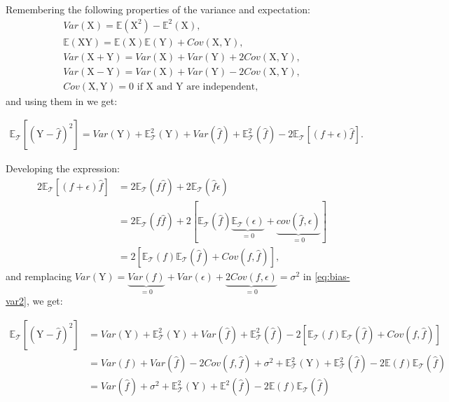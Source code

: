 \documentclass[]{book}
\begin{document}
Remembering the following properties of the variance and expectation:
\[\begin{aligned}
& Var(\mathrm{X}) = \mathbb{E}(\mathrm{X}^2) - \mathbb{E}^2(\mathrm{X}),& \\
& \mathbb{E}(\mathrm{X} \mathrm{Y}) = \mathbb{E}(\mathrm{X})\mathbb{E}(\mathrm{Y}) + Cov(\mathrm{X},\mathrm{Y}),& \\
& Var(\mathrm{X} + \mathrm{Y}) = Var(\mathrm{X}) + Var(\mathrm{Y}) + 2Cov(\mathrm{X},\mathrm{Y}),& \\
& Var(\mathrm{X} - \mathrm{Y}) = Var(\mathrm{X}) + Var(\mathrm{Y}) - 2Cov(\mathrm{X},\mathrm{Y}),& \\
& Cov(\mathrm{X},\mathrm{Y}) = 0 \text{ if $\mathrm{X}$ and $\mathrm{Y}$ are independent},& \end{aligned}\]
and using them in we get:

\begin{equation}
\begin{aligned}
\mathbb{E}_\mathcal{T}[(\mathrm{Y} - \hat{f})^2] = Var(\mathrm{Y}) + \mathbb{E}^2_\mathcal{T}(\mathrm{Y}) + Var(\hat{f}) + \mathbb{E}^2_\mathcal{T}(\hat{f}) - 2\mathbb{E}_\mathcal{T}[(f+\epsilon) \hat{f}].
\end{aligned}
\label{eq:bias-var2}
\end{equation}

Developing the expression: \[\begin{aligned}
2\mathbb{E}_\mathcal{T}[(f+\epsilon) \hat{f}] & = 2\mathbb{E}_\mathcal{T}(f\hat{f}) + 2\mathbb{E}_\mathcal{T}(\hat{f}\epsilon) \\
& = 2\mathbb{E}_\mathcal{T}(f\hat{f}) + 2[\mathbb{E}_\mathcal{T}(\hat{f})\underbrace{\mathbb{E}_\mathcal{T}(\epsilon)}_{=0} + \underbrace{cov(\hat{f},\epsilon)}_{=0}] \\
& = 2[\mathbb{E}_\mathcal{T}(f)\mathbb{E}_\mathcal{T}(\hat{f}) + Cov(f,\hat{f})],\end{aligned}\]
and remplacing \(Var(\mathrm{Y}) = \underbrace{Var(f)}_{=0} + Var(\epsilon) + \underbrace{2Cov(f,\epsilon)}_{=0} = \sigma^2\)
in \eqref{eq:bias-var2}, we get:

\begin{equation}
\begin{aligned}
\mathbb{E}_\mathcal{T}[(\mathrm{Y} - \hat{f})^2] & = Var(\mathrm{Y}) + \mathbb{E}^2_\mathcal{T}(\mathrm{Y}) + Var(\hat{f}) + \mathbb{E}^2_\mathcal{T}(\hat{f}) - 2[\mathbb{E}_\mathcal{T}(f)\mathbb{E}_\mathcal{T}(\hat{f}) + Cov(f,\hat{f})] \\ \nonumber
& = Var(f) + Var(\hat{f}) - 2Cov(f,\hat{f}) + \sigma^2 + \mathbb{E}^2_\mathcal{T}(\mathrm{Y}) + \mathbb{E}^2_\mathcal{T}(\hat{f}) - 2\mathbb{E}(f)\mathbb{E}_\mathcal{T}(\hat{f}) \\ \nonumber
& = Var(\hat{f}) + \sigma^2 + \mathbb{E}_\mathcal{T}^2(\mathrm{Y}) + \mathbb{E}^2(\hat{f}) - 2\mathbb{E}(f)\mathbb{E}_\mathcal{T}(\hat{f})\
\end{aligned}
\label{eq:bias-var3}
\end{equation}
\end{document}
